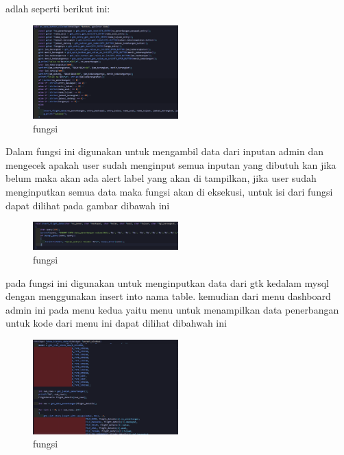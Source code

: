 \documentclass[a4paper,12pt]{article}
\begin{document}
\texttt{} adlah seperti berikut ini:
\begin{figure}[!htbp]
    \centering
    \includegraphics[width=0.5\textwidth]{./img/dashboard_admin/button_tambah_data.png}
    \caption{fungsi \texttt{}}
\end{figure}
\FloatBarrier 
Dalam fungsi ini digunakan untuk mengambil data dari inputan admin dan mengecek apakah user sudah menginput semua inputan yang dibutuh kan jika belum maka akan ada alert label yang akan di tampilkan, 
jika user sudah menginputkan semua data maka fungsi \texttt{} akan di eksekusi, untuk isi dari fungsi \texttt{} dapat dilihat pada gambar dibawah ini
\begin{figure}[!htbp]
    \centering
    \includegraphics[width=0.5\textwidth]{./img/dashboard_admin/inputdata_ke_mysql.png}
    \caption{fungsi \texttt{}}
\end{figure}
\FloatBarrier
pada fungsi ini digunakan untuk menginputkan data dari gtk kedalam mysql dengan menggunakan insert into nama table. kemudian dari menu dashboard admin ini pada menu kedua yaitu menu 
untuk menampilkan data penerbangan untuk kode dari menu ini dapat dilihat dibahwah ini
\begin{figure}[!htbp]
    \centering
    \includegraphics[width=0.5\textwidth]{./img/dashboard_admin/history_widget.png}
    \caption{fungsi \texttt{}}
\end{figure}
\end{document}
